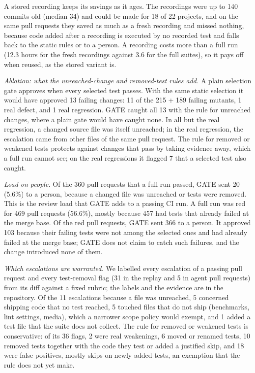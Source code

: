 \documentclass[conference]{IEEEtran}
\begin{document}
A stored recording keeps its savings as it ages. The recordings were up to 140 commits old (median 34) and could be made for 18 of 22 projects, and on the same pull requests they saved as much as a fresh recording and missed nothing, because code added after a recording is executed by no recorded test and falls back to the static rules or to a person. A recording costs more than a full run (12.3 hours for the fresh recordings against 3.6 for the full suites), so it pays off when reused, as the stored variant is.

\emph{Ablation: what the unreached-change and removed-test rules add.} A plain selection gate approves when every selected test passes. With the same static selection it would have approved 13 failing changes: 11 of the 215 + 189 failing mutants, 1 real defect, and 1 real regression. GATE caught all 13 with the rule for unreached changes, where a plain gate would have caught none. In all but the real regression, a changed source file was itself unreached; in the real regression, the escalation came from other files of the same pull request. The rule for removed or weakened tests protects against changes that pass by taking evidence away, which a full run cannot see; on the real regressions it flagged 7 that a selected test also caught.

\emph{Load on people.} Of the 360 pull requests that a full run passed, GATE sent 20 (5.6\%) to a person, because a changed file was unreached or tests were removed. This is the review load that GATE adds to a passing CI run. A full run was red for 469 pull requests (56.6\%), mostly because 457 had tests that already failed at the merge base. Of the red pull requests, GATE sent 366 to a person. It approved 103 because their failing tests were not among the selected ones and had already failed at the merge base; GATE does not claim to catch such failures, and the change introduced none of them.

\emph{Which escalations are warranted.} We labelled every escalation of a passing pull request and every test-removal flag (31 in the replay and 5 in agent pull requests) from its diff against a fixed rubric; the labels and the evidence are in the repository. Of the 11 escalations because a file was unreached, 5 concerned shipping code that no test reached, 5 touched files that do not ship (benchmarks, lint settings, media), which a narrower scope policy would exempt, and 1 added a test file that the suite does not collect. The rule for removed or weakened tests is conservative: of its 36 flags, 2 were real weakenings, 6 moved or renamed tests, 10 removed tests together with the code they test or added a justified skip, and 18 were false positives, mostly skips on newly added tests, an exemption that the rule does not yet make.
\end{document}
